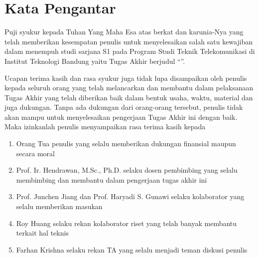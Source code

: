 \chapter*{Kata Pengantar}


Puji syukur kepada Tuhan Yang Maha Esa atas berkat dan karunia-Nya yang telah
memberikan kesempatan penulis untuk menyelesaikan salah satu kewajiban dalam
menempuh studi sarjana S1 pada Program Studi Teknik Telekomunikasi di Institut
Teknologi Bandung yaitu Tugas Akhir berjudul “\textbf{\thetitle}”.

Ucapan terima kasih dan rasa syukur juga tidak lupa disampaikan oleh penulis
kepada seluruh orang yang telah melancarkan dan membantu dalam pelaksanaan
Tugas Akhir yang telah diberikan baik dalam bentuk usaha, waktu, material dan
juga dukungan. Tanpa ada dukungan dari orang-orang tersebut, penulis tidak akan
mampu untuk menyelesaikan pengerjaan Tugas Akhir ini dengan baik. Maka
izinkanlah penulis menyampaikan rasa terima kasih kepada

\begin{enumerate}
    \item Orang Tua penulis yang selalu memberikan dukungan finansial maupun secara moral
    \item Prof. Ir. Hendrawan, M.Sc., Ph.D. selaku dosen pembimbing yang selalu membimbing dan membantu dalam pengerjaan tugas akhir ini
    \item Prof. Junchen Jiang dan Prof. Haryadi S. Gunawi selaku kolaborator yang selalu memberikan masukan
    \item Roy Huang selaku rekan kolaborator riset yang telah banyak membantu terkait hal teknis 
    \item Farhan Krishna selaku rekan TA yang selalu menjadi teman diskusi penulis
\end{enumerate}

